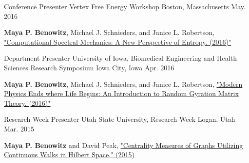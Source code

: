 


\begin{cventries}


\cventry
{Conference Presenter} %
{Vertex Free Energy Workshop} %
{Boston, Massachusetts} %
{May. 2016} %
{ %
\begin{cvitems}
\item {\textbf{Maya P. Benowitz}, Michael J. Schnieders, and Janice L. Robertson,  \href{https://www.researchgate.net/publication/303565840_Computational_Spectral_Mechanics}{"Computational Spectral Mechanics: A New Perspective of Entropy. (2016)"}}
\end{cvitems}
}

\cventry
{Department Presenter} %
{University of Iowa, Biomedical Engineering and Health Sciences Research Symposium} %
{Iowa City, Iowa} %
{Apr. 2016} %
{ %
\begin{cvitems}
\item {\textbf{Maya P. Benowitz}, Michael J. Schnieders, and Janice L. Robertson, \href{https://www.researchgate.net/publication/300819481_Modern_Physics_Ends_Where_Life_Begins_An_Introduction_to_Random_Gyration_Matrix_Theory}{"Modern Physics Ends where Life Begins: An Introduction to Random Gyration Matrix Theory. (2016)"}}
\end{cvitems}
}

\cventry
{Research Week Presenter} %
{Utah State University, Research Week} %
{Logan, Utah} %
{Mar. 2015} %
{ %
\begin{cvitems}
\item {\textbf{Maya P. Benowitz} and David Peak, \href{https://www.researchgate.net/publication/303565763_Centrality_Measures_of_Graphs_utilizing_Continuous_Walks_in_Hilbert_Space}{"Centrality Measures of Graphs Utilizing Continuous Walks in Hilbert Space." (2015)}}
\end{cvitems}
}


\end{cventries}
